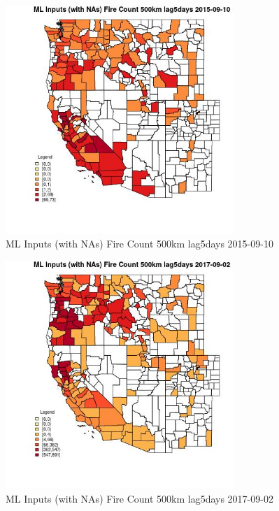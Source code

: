 \begin{figure} 
\centering  
\includegraphics[width=0.77\textwidth]{Code_Outputs/Report_ML_input_PM25_Step4_part_e_de_duplicated_aves_compiled_2019-05-21wNAs_CountyFire_Count_500km_lag5daysMean2015-09-10.jpg} 
\caption{\label{fig:Report_ML_input_PM25_Step4_part_e_de_duplicated_aves_compiled_2019-05-21wNAsCountyFire_Count_500km_lag5daysMean2015-09-10}ML Inputs (with NAs) Fire Count 500km lag5days 2015-09-10} 
\end{figure} 
 

\clearpage 

\begin{figure} 
\centering  
\includegraphics[width=0.77\textwidth]{Code_Outputs/Report_ML_input_PM25_Step4_part_e_de_duplicated_aves_compiled_2019-05-21wNAs_CountyFire_Count_500km_lag5daysMean2017-09-02.jpg} 
\caption{\label{fig:Report_ML_input_PM25_Step4_part_e_de_duplicated_aves_compiled_2019-05-21wNAsCountyFire_Count_500km_lag5daysMean2017-09-02}ML Inputs (with NAs) Fire Count 500km lag5days 2017-09-02} 
\end{figure} 
 

